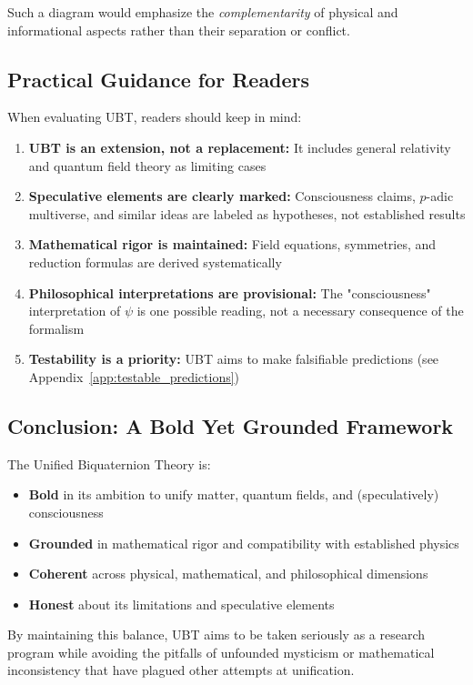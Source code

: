 Such a diagram would emphasize the \emph{complementarity} of physical and informational aspects rather than their separation or conflict.

\subsection{Practical Guidance for Readers}

When evaluating UBT, readers should keep in mind:

\begin{enumerate}
\item \textbf{UBT is an extension, not a replacement:} It includes general relativity and quantum field theory as limiting cases
\item \textbf{Speculative elements are clearly marked:} Consciousness claims, $p$-adic multiverse, and similar ideas are labeled as hypotheses, not established results
\item \textbf{Mathematical rigor is maintained:} Field equations, symmetries, and reduction formulas are derived systematically
\item \textbf{Philosophical interpretations are provisional:} The "consciousness" interpretation of $\psi$ is one possible reading, not a necessary consequence of the formalism
\item \textbf{Testability is a priority:} UBT aims to make falsifiable predictions (see Appendix~\ref{app:testable_predictions})
\end{enumerate}

\subsection{Conclusion: A Bold Yet Grounded Framework}

The Unified Biquaternion Theory is:
\begin{itemize}
\item \textbf{Bold} in its ambition to unify matter, quantum fields, and (speculatively) consciousness
\item \textbf{Grounded} in mathematical rigor and compatibility with established physics
\item \textbf{Coherent} across physical, mathematical, and philosophical dimensions
\item \textbf{Honest} about its limitations and speculative elements
\end{itemize}

By maintaining this balance, UBT aims to be taken seriously as a research program while avoiding the pitfalls of unfounded mysticism or mathematical inconsistency that have plagued other attempts at unification.

